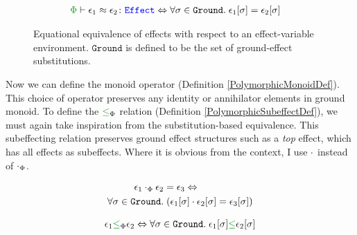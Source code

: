 \documentclass{Report}
\newcommand\groundEffects[0]{\texttt{Ground}}
\begin{document}
\begin{figure}[H]
    \centering
    \begin{framed}
        \begin{align}
            \zpberelation{\e_1}{\e_2}{\effect} & \Leftrightarrow \forall \si\in\groundEffects.\s\e_1\ssi = \e_2\ssi
        \end{align}
    \end{framed}
    
    \caption{Equational equivalence of effects with respect to an effect-variable environment. $\groundEffects$ is defined to be the set of ground-effect substitutions.}
    \label{EffectEquivalence}
\end{figure}
Now we can define the monoid operator (Definition \ref{PolymorphicMonoidDef}). This choice of operator preserves any identity or annihilator elements in ground monoid. To define the $\subeffectp$ relation (Definition \ref{PolymorphicSubeffectDef}), we must again take inspiration from the substitution-based equivalence. This subeffecting relation preserves ground effect structures such as a \textit{top} effect, which has all effects as subeffects. Where it is obvious from the context, I use $\dot$ instead of $\dotp$.


\begin{minipage}{0.47\linewidth}
\begin{framed}
    \begin{definition}\label{PolymorphicMonoidDef}
        \begin{align*}
            \e_1\dotp\e_2 & = \e_3  \Leftrightarrow
            \\
            \forall \si \in\groundEffects. & \s (\e_1\ssi \dot \e_2\ssi = \e_3\ssi)
        \end{align*}
    \end{definition}
\end{framed}
\end{minipage}
\quad
\begin{minipage}{0.47\linewidth}
    \begin{framed}
        \begin{definition}
            \label{PolymorphicSubeffectDef}
            \begin{align*}
                \e_1\subeffectp\e_2\Leftrightarrow \forall\si\in\groundEffects.\s\e_1\ssi\subeffect\e_2\ssi
                \\
            \end{align*}
        \end{definition}
        \end{framed}
\end{minipage}
\end{document}
